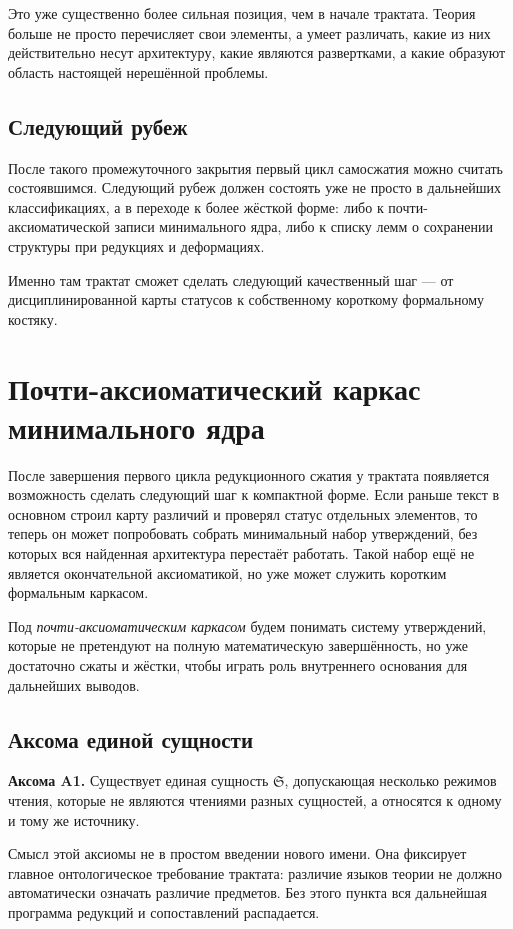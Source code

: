 \documentclass[12pt,a4paper]{article}
\begin{document}
Это уже существенно более сильная позиция, чем в начале трактата. Теория больше не просто перечисляет свои элементы, а умеет различать, какие из них действительно несут архитектуру, какие являются развертками, а какие образуют область настоящей нерешённой проблемы.

\subsection{Следующий рубеж}

После такого промежуточного закрытия первый цикл самосжатия можно считать состоявшимся. Следующий рубеж должен состоять уже не просто в дальнейших классификациях, а в переходе к более жёсткой форме: либо к почти-аксиоматической записи минимального ядра, либо к списку лемм о сохранении структуры при редукциях и деформациях.

Именно там трактат сможет сделать следующий качественный шаг --- от дисциплинированной карты статусов к собственному короткому формальному костяку.

\section{Почти-аксиоматический каркас минимального ядра}

После завершения первого цикла редукционного сжатия у трактата появляется возможность сделать следующий шаг к компактной форме. Если раньше текст в основном строил карту различий и проверял статус отдельных элементов, то теперь он может попробовать собрать минимальный набор утверждений, без которых вся найденная архитектура перестаёт работать. Такой набор ещё не является окончательной аксиоматикой, но уже может служить коротким формальным каркасом.

Под \textit{почти-аксиоматическим каркасом} будем понимать систему утверждений, которые не претендуют на полную математическую завершённость, но уже достаточно сжаты и жёстки, чтобы играть роль внутреннего основания для дальнейших выводов.

\subsection{Аксома единой сущности}

\textbf{Аксома A1.} Существует единая сущность \(\mathfrak{S}\), допускающая несколько режимов чтения, которые не являются чтениями разных сущностей, а относятся к одному и тому же источнику.

Смысл этой аксиомы не в простом введении нового имени. Она фиксирует главное онтологическое требование трактата: различие языков теории не должно автоматически означать различие предметов. Без этого пункта вся дальнейшая программа редукций и сопоставлений распадается.
\end{document}
